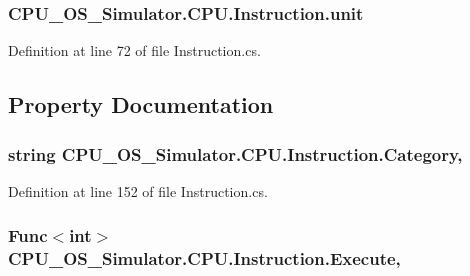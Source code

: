\subsubsection[{unit}]{ C\+P\+U\+\_\+\+O\+S\+\_\+\+Simulator.\+C\+P\+U.\+Instruction.\+unit\hspace{0.3cm}{\ttfamily [private]}}\label{class_c_p_u___o_s___simulator_1_1_c_p_u_1_1_instruction_a0337c93fbfb5993eab37f1d052ca5f43}


Definition at line 72 of file Instruction.\+cs.



\subsection{Property Documentation}
\hypertarget{class_c_p_u___o_s___simulator_1_1_c_p_u_1_1_instruction_a7b7c3068cebbf81c64b67496b20c733a}{}
\subsubsection[{Category}]{\setlength{\rightskip}{0pt plus 5cm}string C\+P\+U\+\_\+\+O\+S\+\_\+\+Simulator.\+C\+P\+U.\+Instruction.\+Category\hspace{0.3cm}{\ttfamily [get]}, {\ttfamily [set]}}\label{class_c_p_u___o_s___simulator_1_1_c_p_u_1_1_instruction_a7b7c3068cebbf81c64b67496b20c733a}


Definition at line 152 of file Instruction.\+cs.

\hypertarget{class_c_p_u___o_s___simulator_1_1_c_p_u_1_1_instruction_afc4c52737c07181195a29413cf09d2a5}{}
\subsubsection[{Execute}]{\setlength{\rightskip}{0pt plus 5cm}Func$<$int$>$ C\+P\+U\+\_\+\+O\+S\+\_\+\+Simulator.\+C\+P\+U.\+Instruction.\+Execute\hspace{0.3cm}{\ttfamily [get]}, {\ttfamily [set]}}\label{class_c_p_u___o_s___simulator_1_1_c_p_u_1_1_instruction_afc4c52737c07181195a29413cf09d2a5}


